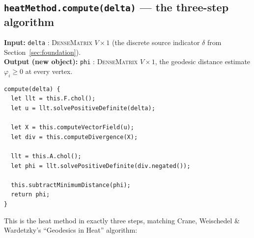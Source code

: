 \documentclass[11pt]{article}
\newcommand{\code}[1]{\texttt{#1}}
\newcommand{\func}[1]{\texttt{\textbf{#1}}}
\newcommand{\type}[1]{\textsc{#1}}
\begin{document}
\subsection{\func{heatMethod.compute(delta)} --- the three-step algorithm}
\label{sec:compute}
\textbf{Input:} \code{delta} : \type{DenseMatrix} $V\times1$ (the discrete source
indicator $\delta$ from Section~\ref{sec:foundation}).\\
\textbf{Output (new object):} \code{phi} : \type{DenseMatrix} $V\times1$, the geodesic
distance estimate $\varphi_i\ge0$ at every vertex.

\begin{lstlisting}
compute(delta) {
  let llt = this.F.chol();
  let u = llt.solvePositiveDefinite(delta);

  let X = this.computeVectorField(u);
  let div = this.computeDivergence(X);

  llt = this.A.chol();
  let phi = llt.solvePositiveDefinite(div.negated());

  this.subtractMinimumDistance(phi);
  return phi;
}
\end{lstlisting}

This is the heat method in exactly three steps, matching Crane, Weischedel \& Wardetzky's
``Geodesics in Heat'' algorithm:
\end{document}
